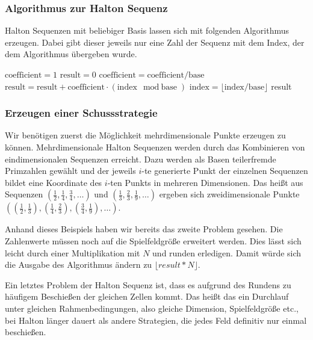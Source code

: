 \documentclass[a4paper,12pt]{llncs}
\numberwithin{equation}{section}
\begin{document}
\subsubsection{Algorithmus zur Halton Sequenz}
Halton Sequenzen mit beliebiger Basis lassen sich mit folgenden Algorithmus erzeugen. Dabei gibt dieser jeweils nur eine Zahl der Sequenz mit dem Index, der dem Algorithmus übergeben wurde.

\begin{tcolorbox}
	\begin{algorithmic}
		\State $\text{coefficient} = 1$
		\State $ \text{result} = 0$
		\State $\text{coefficient} = \text{coefficient} / \text{base}$
		\State $\text{result} = \text{result} + \text{coefficient} \cdot (\text{index}\mod \text{base})$
		\State $\text{index} = \lfloor \text{index}/\text{base} \rfloor $
		\EndWhile
		\State \Return result
		\EndFunction
	\end{algorithmic}
\end{tcolorbox}

\subsubsection{Erzeugen einer Schussstrategie}
Wir benötigen zuerst die Möglichkeit mehrdimensionale Punkte erzeugen zu können. Mehrdimensionale Halton Sequenzen werden durch das Kombinieren von eindimensionalen Sequenzen erreicht. Dazu werden als Basen teilerfremde Primzahlen gewählt und der jeweils $i$-te generierte Punkt der einzelnen Sequenzen bildet eine Koordinate des $i$-ten Punkts in mehreren Dimensionen. Das heißt aus Sequenzen $\left(\frac{1}{2},\frac{1}{4},\frac{3}{4},\dots\right)$ und $\left(\frac{1}{3},\frac{2}{3},\frac{1}{9},\dots\right)$ ergeben sich zweidimensionale Punkte $\left(\left(\frac{1}{2},\frac{1}{3}\right),\left(\frac{1}{4},\frac{2}{3}\right),\left(\frac{3}{4},\frac{1}{9}\right),\dots\right)$.

Anhand dieses Beispiels haben wir bereits das zweite Problem gesehen. Die Zahlenwerte müssen noch auf die Spielfeldgröße erweitert werden. Dies lässt sich leicht durch einer Multiplikation mit $N$ und runden erledigen. Damit würde sich die Ausgabe des Algorithmus ändern zu $\lfloor result * N \rfloor$.

Ein letztes Problem der Halton Sequenz ist, dass es aufgrund des Rundens zu häufigem Beschießen der gleichen Zellen kommt. Das heißt das ein Durchlauf unter gleichen Rahmenbedingungen, also gleiche Dimension, Spielfeldgröße etc., bei Halton länger dauert als andere Strategien, die jedes Feld definitiv nur einmal beschießen. 
 
\end{document}
